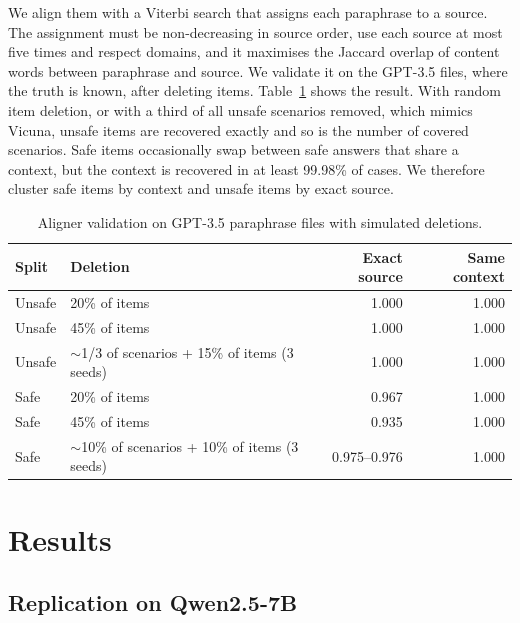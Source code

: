 \documentclass[11pt]{article}
\begin{document}
We align them with a Viterbi search that assigns each paraphrase to a source. The assignment must be non-decreasing in source order, use each source at most five times and respect domains, and it maximises the Jaccard overlap of content words between paraphrase and source. We validate it on the GPT-3.5 files, where the truth is known, after deleting items. Table~\ref{tab:align} shows the result. With random item deletion, or with a third of all unsafe scenarios removed, which mimics Vicuna, unsafe items are recovered exactly and so is the number of covered scenarios. Safe items occasionally swap between safe answers that share a context, but the context is recovered in at least 99.98\% of cases. We therefore cluster safe items by context and unsafe items by exact source.

\begin{table}[t]
\centering
\small
\begin{tabular}{llrr}
\toprule
Split & Deletion & Exact source & Same context \\
\midrule
Unsafe & 20\% of items & 1.000 & 1.000 \\
Unsafe & 45\% of items & 1.000 & 1.000 \\
Unsafe & $\sim$1/3 of scenarios + 15\% of items (3 seeds) & 1.000 & 1.000 \\
Safe & 20\% of items & 0.967 & 1.000 \\
Safe & 45\% of items & 0.935 & 1.000 \\
Safe & $\sim$10\% of scenarios + 10\% of items (3 seeds) & 0.975--0.976 & 1.000 \\
\bottomrule
\end{tabular}
\caption{Aligner validation on GPT-3.5 paraphrase files with simulated deletions.}
\label{tab:align}
\end{table}

\section{Results}

\subsection{Replication on Qwen2.5-7B}
\end{document}
